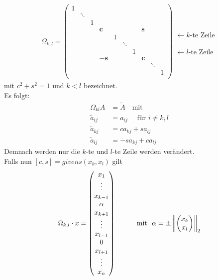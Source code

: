 \begin{gather}
\Omega _{k,l} = \begin{pmatrix}
1 &&&&&&&&& \\
& \ddots\\
&& 1\\
&&& \mathbf{c} &&&& \mathbf{s} \\
&&&& 1\\
&&&&& \ddots \\
&&&&&& 1\\
&&& -\mathbf{s} &&&& \mathbf{c} \\
&&&&&&&& \ddots \\
&&&&&&&&& 1\\
\end{pmatrix}
\begin{array}{l}
\\   \leftarrow \text{$k$-te Zeile}
\\ \\ \\ \\ \leftarrow \text{$l$-te Zeile}
\end{array}
\label{IV.4.5}
\end{gather}
mit $c^2+s^2=1$ und $k<l$ bezeichnet.\\
Es folgt:
\begin{align*}
\Omega_{kl} A &= \widetilde{A} \quad \text{mit} \\
\widetilde{a}_{ij}  &= a_{ij} \quad \text{ für } i\neq k,l \\
\widetilde{a}_{kj} & = ca_{kj}+sa_{lj} \\
\widetilde{a}_{lj} & = -sa_{kj} + ca_{lj}
\end{align*}
Demnach werden nur die $k$-te und $l$-te Zeile werden verändert. \\
Falls nun $[c,s] = givens(x_k, x_l)$ gilt
\begin{gather}
\Omega_{k,l}\cdot x = \begin{pmatrix}
x_1 \\ \vdots \\x_{k-1} \\\alpha \\ x_{k+1}
\\\vdots \\
x_{l-1} \\ 0 \\x_{l+1} \\\vdots \\x_n
\end{pmatrix}
\qquad
\quad \text{mit~~}
\alpha = \pm \left\|   \begin{pmatrix} x_k \\ x_l\end{pmatrix} \right\|_2
\label{IV.4.6}
\end{gather}
